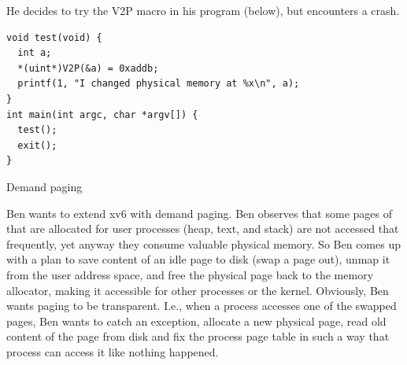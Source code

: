 \documentclass[11pt]{exam}
\begin{document}
\begin{questions}
He decides to try the V2P macro in his program (below), but encounters a crash.
\begin{verbatim}
void test(void) {
  int a;
  *(uint*)V2P(&a) = 0xaddb;
  printf(1, "I changed physical memory at %x\n", a);
}
int main(int argc, char *argv[]) {
  test();
  exit();
}
\end{verbatim}


\newpage
\addpoints
\question Demand paging 

Ben wants to extend xv6 with demand paging. Ben observes that some pages of
that are allocated for user processes (heap, text, and stack) are not accessed
that frequently, yet anyway they consume valuable physical memory. So Ben comes
up with a plan to save content of an idle page to disk (swap a page out), unmap
it from the user address space, and free the physical page back to the memory
allocator, making it accessible for other processes or the kernel. Obviously,
Ben wants paging to be transparent. I.e., when a process accesses one of the
swapped pages, Ben wants to catch an exception, allocate a new physical page,
read old content of the page from disk and fix the process page table in such a
way that process can access it like nothing happened. 



\end{questions}
\end{document}
